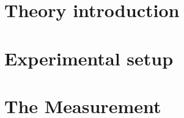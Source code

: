 \documentclass[11pt,notitlepage,twoside,BCOR=8.25mm,headsepline,numbers=noendperiod,DIV=14]{scrbook} %
\begin{document}


  \dominitoc[n]  

%


%

\tableofcontents



\linenumbers
  \mainmatter

  
  \part{Theory introduction}
  
  
  \part{Experimental setup}
  
  
  
  
  
  \part{The Measurement}
  
  
  
  
  
  
  

  

%
%
%
%
%
%
%
%
%

%
  
  
\backmatter
  
\cleardoublepage
{}
{}
%
%
%

{\small
%
{} 
}
%
%
\end{document}
